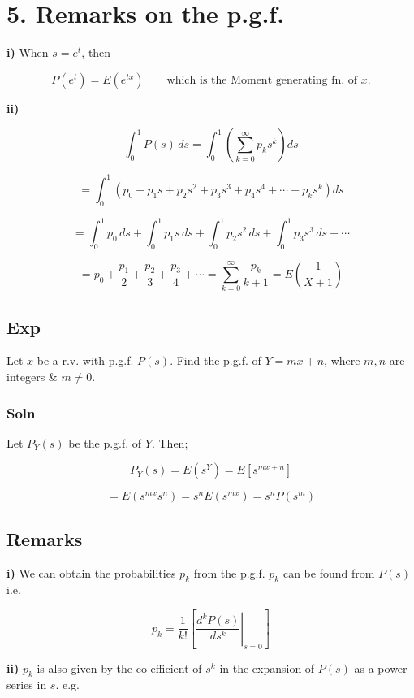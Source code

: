 \documentclass[
]{article}
\begin{document}
\section{5. Remarks on the p.g.f.}\label{remarks-on-the-p.g.f.}

\textbf{i)} When \(s = e^t\), then

\[P\left(e^t\right) = E\left(e^{tx}\right) \qquad \text{which is the Moment generating fn. of } x.\]

\textbf{ii)}

\[\int_0^1 P(s)\, ds = \int_0^1 \left( \sum_{k=0}^{\infty} p_k s^k \right) ds\]

\[= \int_0^1 \left( p_0 + p_1 s + p_2 s^2 + p_3 s^3 + p_4 s^4 + \cdots + p_k s^k \right) ds\]

\[= \int_0^1 p_0\, ds + \int_0^1 p_1 s\, ds + \int_0^1 p_2 s^2\, ds + \int_0^1 p_3 s^3\, ds + \cdots\]

\[= p_0 + \frac{p_1}{2} + \frac{p_2}{3} + \frac{p_3}{4} + \cdots = \sum_{k=0}^{\infty} \frac{p_k}{k+1} = E\left( \frac{1}{X+1} \right)\]

\subsection{Exp}\label{exp}

Let \(x\) be a r.v. with p.g.f. \(P(s)\). Find the p.g.f. of
\(Y = mx + n\), where \(m, n\) are integers \& \(m \ne 0\).

\subsubsection{Soln}\label{soln-1}

Let \(P_Y(s)\) be the p.g.f. of \(Y\). Then;

\[P_Y(s) = E\left(s^Y\right) = E\left[s^{mx+n}\right]\]

\[= E\left(s^{mx} s^n\right) = s^n E\left(s^{mx}\right) = s^n P\left(s^m\right)\]

\subsection{Remarks}\label{remarks}

\textbf{i)} We can obtain the probabilities \(p_k\) from the p.g.f.
\(p_k\) can be found from \(P(s)\) i.e.

\[p_k = \frac{1}{k!} \left[ \left. \frac{d^k P(s)}{ds^k} \right|_{s=0} \right]\]

\textbf{ii)} \(p_k\) is also given by the co-efficient of \(s^k\) in the
expansion of \(P(s)\) as a power series in \(s\). e.g.
\end{document}
